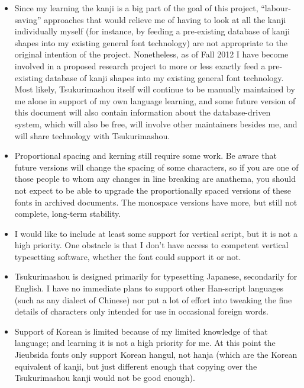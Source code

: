 \documentclass[14pt]{extarticle}
\begin{document}
\begin{itemize}
  \item Since my learning the kanji is a big part of the goal of this
  project, ``labour-saving'' approaches that would relieve me of having to
  look at all the kanji individually myself (for instance, by feeding a
  pre-existing database of kanji shapes into my existing general font
  technology) are not appropriate to the original intention of the project. 
  Nonetheless, as of Fall 2012 I have become involved in a proposed research
  project to more or less exactly feed a pre-existing database of kanji
  shapes into my existing general font technology.  Most likely,
  Tsukurimashou itself will continue to be manually maintained by me alone
  in support of my own language learning, and some future version of this
  document will also contain information about the database-driven system,
  which will also be free, will involve other maintainers besides me, and
  will share technology with Tsukurimashou.

  \item Proportional spacing and kerning still require some work.  Be aware
  that future versions will change the spacing of some characters, so if you
  are one of those people to whom any changes in line breaking are anathema,
  you should not expect to be able to upgrade the proportionally spaced
  versions of these fonts in archived documents.  The monospace
  versions have more, but still not complete, long-term stability.

  \item I would like to include at least some support for vertical script,
  but it is not a high priority.  One obstacle is that I don't have access
  to competent vertical typesetting software, whether the font could support
  it or not.

  \item Tsukurimashou is designed primarily for typesetting Japanese,
  secondarily for English.  I have no immediate plans to support
  other Han-script languages (such as any dialect of Chinese) nor put a
  lot of effort into tweaking the fine details of characters only intended
  for use in occasional foreign words.

  \item Support of Korean is limited because of my limited knowledge
  of that language; and learning it is not a high priority for me.  At
  this point the Jieubsida fonts only support Korean hangul, not hanja
  (which are the Korean equivalent of kanji, but just different enough
  that copying over the Tsukurimashou kanji would not be good enough).


\end{itemize}
\end{document}
